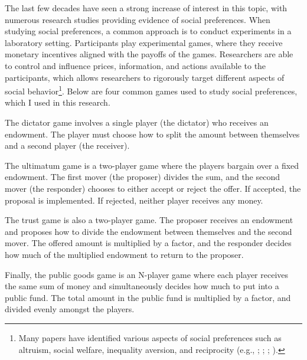 \documentclass[12pt]{article}
\begin{document}
The last few decades have seen a strong increase of interest in this topic, with numerous research studies providing evidence of social preferences. When studying social preferences, a common approach is to conduct experiments in a laboratory setting. Participants play experimental games, where they receive monetary incentives aligned with the payoffs of the games. Researchers are able to control and influence prices, information, and actions available to the participants, which allows researchers to rigorously target different aspects of social behavior\footnote{Many papers have identified various aspects of social preferences such as altruism, social welfare, inequality aversion, and reciprocity (e.g., \cite{charness_rabin_2002}; \cite{fehr_schmidt_1999}; \cite{rabin_1993}; \cite{fisman_jakiela_kariv_2014}).}. Below are four common games used to study social preferences, which I used in this research. 

The dictator game involves a single player (the dictator) who receives an endowment. The player must choose how to split the amount between themselves and a second player (the receiver). 

The ultimatum game is a two-player game where the players bargain over a fixed endowment. The first mover (the proposer) divides the sum, and the second mover (the responder) chooses to either accept or reject the offer. If accepted, the proposal is implemented. If rejected, neither player receives any money. 

The trust game is also a two-player game. The proposer receives an endowment and proposes how to divide the endowment between themselves and the second mover. The offered amount is multiplied by a factor, and the responder decides how much of the multiplied endowment to return to the proposer. 

Finally, the public goods game is an N-player game where each player receives the same sum of money and simultaneously decides how much to put into a public fund. The total amount in the public fund is multiplied by a factor, and divided evenly amongst the players.
\end{document}
